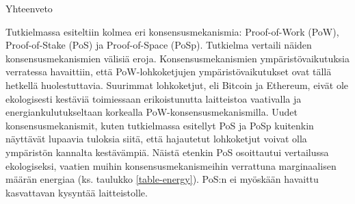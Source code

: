 \begin{chapter}{Yhteenveto\label{yhteenveto}}
\begin{otherlanguage}{finnish}

Tutkielmassa esiteltiin kolmea eri konsensusmekanismia: Proof-of-Work (PoW), Proof-of-Stake (PoS) ja Proof-of-Space (PoSp). Tutkielma vertaili näiden konsensusmekanismien välisiä eroja. Konsensusmekanismien ympäristövaikutuksia verratessa havaittiin, että PoW-lohkoketjujen ympäristövaikutukset ovat tällä hetkellä huolestuttavia. Suurimmat lohkoketjut, eli Bitcoin ja Ethereum, eivät ole ekologisesti kestäviä toimiessaan erikoistunutta laitteistoa vaativalla ja energiankulutukseltaan korkealla PoW-konsensusmekanismilla. Uudet konsensusmekanismit, kuten tutkielmassa esitellyt PoS ja PoSp kuitenkin näyttävät lupaavia tuloksia siitä, että hajautetut lohkoketjut voivat olla ympäristön kannalta kestävämpiä. Näistä etenkin PoS osoittautui vertailussa ekologiseksi, vaatien muihin konsensusmekanismeihin verrattuna marginaalisen määrän energiaa (ks. taulukko \ref{table-energy}). PoS:n ei myöskään havaittu kasvattavan kysyntää laitteistolle.


\end{otherlanguage}
\end{chapter}